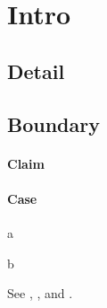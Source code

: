 \section{Intro}
\subsection{Detail}\label{sub:detail}
\subsection{Boundary}\label{sub:boundary}
\paragraph{Claim}\label{par:claim}
\paragraph{Case}\label{par:case}
\begin{theorem}\label{thm:first}
a
\end{theorem}
\begin{lemma}\label{lem:first}
b
\end{lemma}
See , , and .
